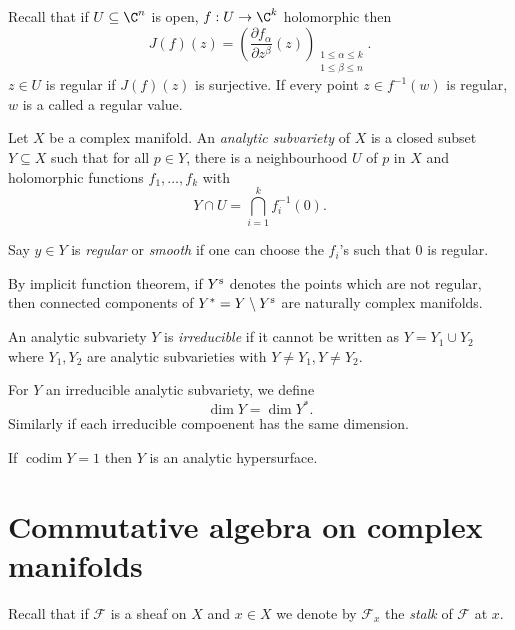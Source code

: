 \documentclass[a4paper]{article}
\begin{document}
Recall that if \(U \subseteq \C^n\) is open, \(f: U \to \C^k\) holomorphic then
\[
  J(f)(z) = \left( \frac{\partial f_\alpha}{\partial z^\beta}(z) \right)_{\substack{1 \leq \alpha \leq k \\ 1 \leq \beta \leq n}}.
\]
\(z \in U\) is regular if \(J(f)(z)\) is surjective. If every point \(z \in f^{-1}(w)\) is regular, \(w\) is a called a regular value.

\begin{definition}
  Let \(X\) be a complex manifold. An \emph{analytic subvariety} of \(X\) is a closed subset \(Y \subseteq X\) such that for all \(p \in Y\), there is a neighbourhood \(U\) of \(p\) in \(X\) and holomorphic functions \(f_1, \dots, f_k\) with
  \[
    Y \cap U = \bigcap_{i = 1}^k f_i^{-1}(0).
  \]

  Say \(y \in Y\) is \emph{regular} or \emph{smooth} if one can choose the \(f_i\)'s such that \(0\) is regular.
\end{definition}

By implicit function theorem, if \(Y^{\text s}\) denotes the points which are not regular, then connected components of \(Y^* = Y \setminus Y^{\text s}\) are naturally complex manifolds.

\begin{definition}[irreducible]
  An analytic subvariety \(Y\) is \emph{irreducible} if it cannot be written as \(Y = Y_1 \cup Y_2\) where \(Y_1, Y_2\) are analytic subvarieties with \(Y \neq Y_1, Y \neq Y_2\).
\end{definition}

\begin{definition}
  For \(Y\) an irreducible analytic subvariety, we define
  \[
    \dim Y = \dim Y^*.
  \]
  Similarly if each irreducible compoenent has the same dimension.

\end{definition}

If \(\operatorname{codim} Y = 1\) then \(Y\) is an analytic hypersurface.

\section{Commutative algebra on complex manifolds}

Recall that if \(\mathcal F\) is a sheaf on \(X\) and \(x \in X\) we denote by \(\mathcal F_x\) the \emph{stalk} of \(\mathcal F\) at \(x\).
\end{document}
